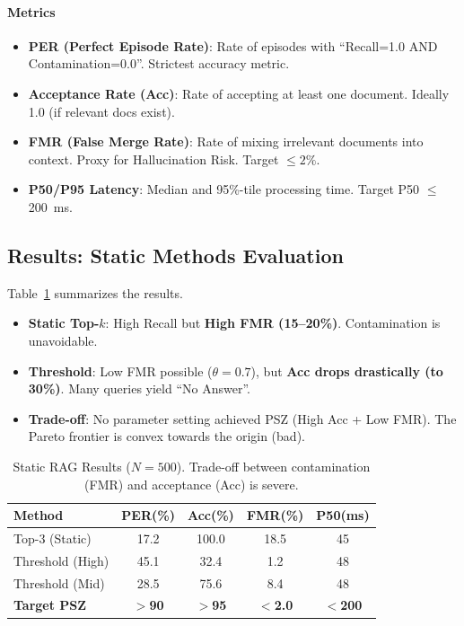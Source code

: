 \documentclass[12pt]{article}
\begin{document}
\paragraph{Metrics}\;
\begin{itemize}
    \item \textbf{PER (Perfect Episode Rate)}: Rate of episodes with ``Recall=1.0 AND Contamination=0.0''. Strictest accuracy metric.
    \item \textbf{Acceptance Rate (Acc)}: Rate of accepting at least one document. Ideally 1.0 (if relevant docs exist).
    \item \textbf{FMR (False Merge Rate)}: Rate of mixing irrelevant documents into context. Proxy for Hallucination Risk. Target $\le 2\%$.
    \item \textbf{P50/P95 Latency}: Median and 95\%-tile processing time. Target P50 $\le$ \SI{200}{ms}.
\end{itemize}

\subsection{Results: Static Methods Evaluation}
Table~\ref{tab:rag_static_result} summarizes the results.
\begin{itemize}
    \item \textbf{Static Top-$k$}: High Recall but \textbf{High FMR (15--20\%)}. Contamination is unavoidable.
    \item \textbf{Threshold}: Low FMR possible ($\theta=0.7$), but \textbf{Acc drops drastically (to 30\%)}. Many queries yield ``No Answer''.
    \item \textbf{Trade-off}: No parameter setting achieved PSZ (High Acc + Low FMR). The Pareto frontier is convex towards the origin (bad).
\end{itemize}

\begin{table}[H]
    \centering
    \caption{Static RAG Results ($N=500$). Trade-off between contamination (FMR) and acceptance (Acc) is severe.}
    \label{tab:rag_static_result}
    \small
    \begin{tabular}{lcccc}
    \toprule
    Method & PER(\%) & Acc(\%) & FMR(\%) & P50(ms) \\
    \midrule
    Top-3 (Static) & 17.2 & 100.0 & 18.5 & 45 \\
    Threshold (High) & 45.1 & 32.4 & 1.2 & 48 \\
    Threshold (Mid) & 28.5 & 75.6 & 8.4 & 48 \\
    \textbf{Target PSZ} & \textbf{$>$90} & \textbf{$>$95} & \textbf{$<$2.0} & \textbf{$<$200} \\
    \bottomrule
    \end{tabular}
\end{table}
\end{document}
